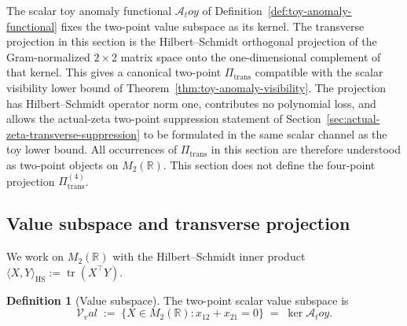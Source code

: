 \documentclass[11pt,a4paper]{amsart}
\def\toy{toy}%
\def\val{val}%
\numberwithin{equation}{section}
\theoremstyle{plain}
\theoremstyle{definition}
\newtheorem{definition}[theorem]{Definition}
\newcommand{\toy}{\mathrm{toy}}
\newcommand{\val}{\mathrm{val}}
\newcommand{\trans}{\mathrm{trans}}
\begin{document}
The scalar toy anomaly functional \(\mathcal A_\toy\) of
Definition~\ref{def:toy-anomaly-functional} fixes the two-point value
subspace as its kernel.  The transverse projection in this section is
the Hilbert--Schmidt orthogonal projection of the Gram-normalized
\(2\times2\) matrix space onto the one-dimensional complement of that
kernel.  This gives a canonical two-point \(\Pi_\trans\) compatible
with the scalar visibility lower bound of
Theorem~\ref{thm:toy-anomaly-visibility}.  The projection has
Hilbert--Schmidt operator norm one, contributes no polynomial loss,
and allows the actual-zeta two-point suppression statement of
Section~\ref{sec:actual-zeta-transverse-suppression} to be formulated
in the same scalar channel as the toy lower bound.  All occurrences of \(\Pi_\trans\) in this section are therefore
understood as two-point objects on \(M_2(\mathbb R)\).  This section does
not define the four-point projection \(\Pi_\trans^{(4)}\).

\subsection{Value subspace and transverse projection}
\label{subsec:transverse-projection-construction}

We work on \(M_{2}(\mathbb R)\) with the Hilbert--Schmidt inner product
\(
        \langle X,Y\rangle_{\mathrm{HS}}
        :=\operatorname{tr}(X^\top Y).
\)

\begin{definition}[Value subspace]
\label{def:value-subspace}
The two-point scalar value subspace is
\begin{equation}
\label{eq:V-val}
        \mathcal V_\val
        \;:=\;\bigl\{X\in M_{2}(\mathbb R):x_{12}+x_{21}=0\bigr\}
        \;=\;\ker\mathcal A_\toy.
\end{equation}
\end{definition}
\end{document}

